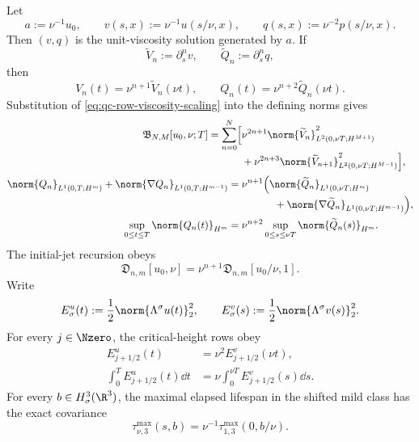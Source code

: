\begin{proposition}
\label{prop:qc-exact-viscosity-scaling}
Let
\[
 a:=\nu^{-1}u_0,
 \qquad
 v(s,x):=\nu^{-1}u(s/\nu,x),
 \qquad
 q(s,x):=\nu^{-2}p(s/\nu,x).
\]
Then \((v,q)\) is the unit-viscosity solution generated by \(a\).  If
\[
 \widetilde V_n:=\partial_s^nv,
 \qquad
 \widetilde Q_n:=\partial_s^nq,
\]
then
\begin{equation}
 V_n(t)=\nu^{n+1}\widetilde V_n(\nu t),
 \qquad
 Q_n(t)=\nu^{n+2}\widetilde Q_n(\nu t).
 \label{eq:qc-row-viscosity-scaling}
\end{equation}
Substitution of \eqref{eq:qc-row-viscosity-scaling} into the defining norms gives
\begin{align}
 \mathfrak B_{N,M}[u_0,\nu;T]
 =\sum_{n=0}^{N}\Bigl[{}
 &\nu^{2n+1}
 \norm{\widetilde V_n}_{L^2(0,\nu T;H^{M+1})}^2
 \notag\\[-2pt]
 &+\nu^{2n+3}
 \norm{\widetilde V_{n+1}}_{L^2(0,\nu T;H^{M-1})}^2
 \Bigr],
 \label{eq:qc-rectangle-viscosity-scaling}\\
 \norm{Q_n}_{L^1(0,T;H^m)}
 +\norm{\nabla Q_n}_{L^1(0,T;H^{m-1})}
 ={}&\nu^{n+1}\Bigl(
 \norm{\widetilde Q_n}_{L^1(0,\nu T;H^m)}
 \notag\\[-2pt]
 &\hspace{32pt}+
 \norm{\nabla\widetilde Q_n}_{L^1(0,\nu T;H^{m-1})}
 \Bigr),
 \label{eq:qc-pressure-viscosity-scaling}\\
 \sup_{0\le t\le T}\norm{Q_n(t)}_{H^m}
 ={}&\nu^{n+2}
 \sup_{0\le s\le\nu T}\norm{\widetilde Q_n(s)}_{H^m}.
 \label{eq:qc-pressure-sup-viscosity-scaling}
\end{align}
The initial-jet recursion obeys
\begin{equation}
 \mathfrak D_{n,m}[u_0,\nu]
 =\nu^{n+1}\mathfrak D_{n,m}[u_0/\nu,1].
 \label{eq:qc-initial-jet-viscosity-scaling}
\end{equation}
Write
\[
 E_\sigma^u(t):=\frac12\norm{\Lambda^\sigma u(t)}_2^2,
 \qquad
 E_\sigma^v(s):=\frac12\norm{\Lambda^\sigma v(s)}_2^2.
\]
For every \(j\in\Nzero\), the critical-height rows obey
\begin{align}
 E_{j+1/2}^u(t)
 &=\nu^2E_{j+1/2}^v(\nu t),
 \label{eq:qc-critical-height-viscosity-scaling}\\
 \int_0^T E_{j+1/2}^u(t)\dd t
 &=\nu\int_0^{\nu T}E_{j+1/2}^v(s)\dd s.
 \label{eq:qc-critical-height-mass-viscosity-scaling}
\end{align}
For every \(b\in H^3_\sigma(\R^3)\), the maximal elapsed lifespan in the
shifted mild class has the exact covariance
\begin{equation}
 \tau_{\nu,3}^{\max}(s,b)
 =\nu^{-1}\tau_{1,3}^{\max}(0,b/\nu).
 \label{eq:qc-maximal-lifespan-viscosity-scaling}
\end{equation}
\end{proposition}

